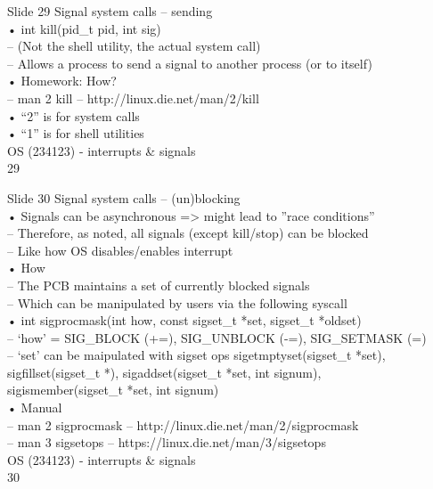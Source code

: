 \documentclass{beamer}
\begin{document}
\begin{frame}{Slide 29}
Signal system calls – sending\\• int kill(pid\_t pid, int sig)\\– (Not the shell utility, the actual system call)\\– Allows a process to send a signal to another process (or to itself)\\• Homework: How?\\– man 2 kill – http://linux.die.net/man/2/kill\\• “2” is for system calls\\• “1” is for shell utilities\\OS (234123) - interrupts \& signals\\29
\end{frame}
\begin{frame}{Slide 30}
Signal system calls – (un)blocking\\• Signals can be asynchronous => might lead to ”race conditions”\\– Therefore, as noted, all signals (except kill/stop) can be blocked\\– Like how OS disables/enables interrupt\\• How\\– The PCB maintains a set of currently blocked signals\\– Which can be manipulated by users via the following syscall\\• int sigprocmask(int how, const sigset\_t *set, sigset\_t *oldset)\\– ‘how’ = SIG\_BLOCK (+=), SIG\_UNBLOCK (-=), SIG\_SETMASK (=)\\– ‘set’ can be maipulated with sigset ops sigetmptyset(sigset\_t *set),    \\sigfillset(sigset\_t *), sigaddset(sigset\_t *set, int signum), \\sigismember(sigset\_t *set, int signum)\\• Manual\\– man 2 sigprocmask – http://linux.die.net/man/2/sigprocmask\\– man 3 sigsetops – https://linux.die.net/man/3/sigsetops\\OS (234123) - interrupts \& signals\\30
\end{frame}
\end{document}
